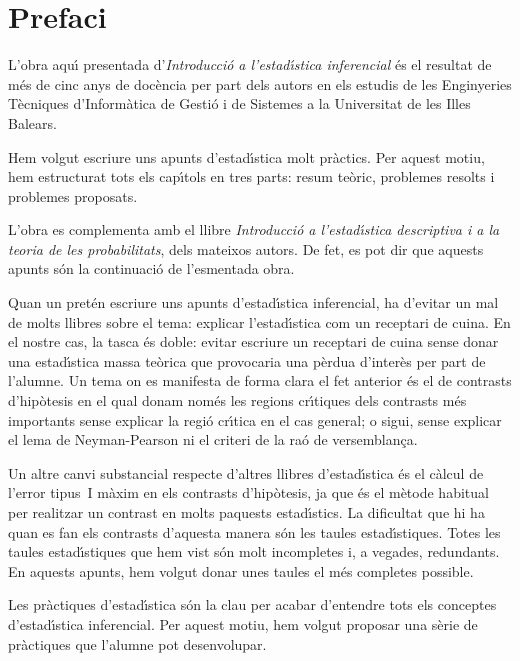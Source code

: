 \frontmatter
\chapter{Prefaci}

L'obra aqu\'{\i} presentada d'{\it Introducci\'o a 
l'estad\'{\i}stica inferencial}
\'es el resultat de m\'es de cinc anys de doc\`encia per
part dels autors en els estudis de les Enginyeries T\`ecniques
d'Inform\`atica de Gesti\'o i de Sistemes a la Universitat de les Illes
Balears.

Hem volgut escriure uns apunts d'estad\'{\i}stica molt pr\`actics. Per
aquest motiu, hem estructurat tots els cap\'{\i}tols en tres parts:
resum te\`oric, problemes resolts i problemes proposats.

L'obra es complementa amb el llibre {\it Introducci\'o a l'estad\'{\i}stica
descriptiva i a la teoria de les probabilitats}, dels mateixos autors.
De fet, es pot dir que aquests apunts s\'on la continuaci\'o de
l'esmentada obra.

Quan un pret\'en escriure uns apunts 
d'estad\'{\i}stica inferencial, ha
d'evitar un mal de molts llibres sobre el tema: explicar
l'estad\'{\i}stica com un receptari de cuina. En el nostre cas, la tasca
\'es doble: evitar escriure un receptari de cuina sense donar una
estad\'{\i}stica massa te\`orica que provocaria una p\`erdua
d'inter\`es per part de l'alumne.
Un tema on es manifesta de forma clara el fet anterior \'es el de
contrasts d'hip\`otesis en el qual donam nom\'es les regions cr\'{\i}tiques dels
contrasts m\'es importants sense explicar la regi\'o cr\'{\i}tica en el
cas general; o sigui, sense explicar el lema de Neyman-Pearson ni el
criteri de la ra\'o de versemblan\c{c}a.

Un altre canvi substancial respecte d'altres llibres d'estad\'{\i}stica
\'es el c\`alcul de l'error tipus~I m\`axim en els contrasts
d'hip\`otesis, ja que \'es el m\`etode habitual per realitzar un contrast
en molts paquests estad\'{\i}stics. La dificultat que hi ha quan es fan els
contrasts d'aquesta manera s\'on les taules estad\'{\i}stiques. Totes
les taules estad\'{\i}stiques que hem vist s\'on molt incompletes i, a
vegades, redundants. En aquests apunts, hem volgut donar unes taules el
m\'es completes possible.

Les pr\`actiques d'estad\'{\i}stica s\'on la clau per acabar d'entendre
tots els conceptes d'estad\'{\i}stica inferencial. Per aquest motiu, hem
volgut proposar una s\`erie de pr\`actiques que l'alumne pot
desenvolupar.

